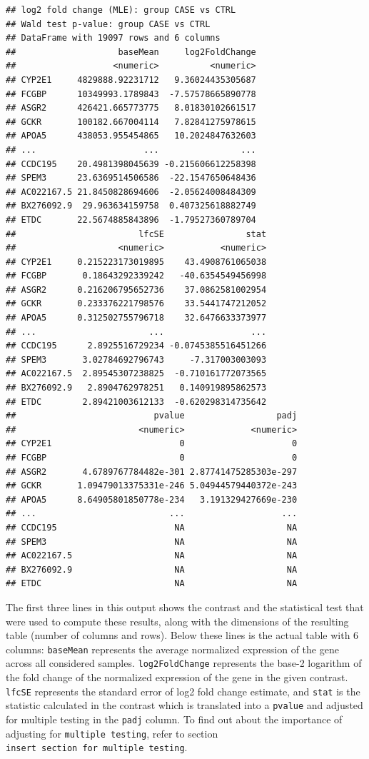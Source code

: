 \documentclass[12pt,]{krantz}
\begin{document}
\begin{verbatim}
## log2 fold change (MLE): group CASE vs CTRL 
## Wald test p-value: group CASE vs CTRL 
## DataFrame with 19097 rows and 6 columns
##                    baseMean     log2FoldChange
##                   <numeric>          <numeric>
## CYP2E1     4829888.92231712   9.36024435305687
## FCGBP      10349993.1789843  -7.57578665890778
## ASGR2      426421.665773775   8.01830102661517
## GCKR       100182.667004114   7.82841275978615
## APOA5      438053.955454865   10.2024847632603
## ...                     ...                ...
## CCDC195    20.4981398045639 -0.215606612258398
## SPEM3      23.6369514506586  -22.1547650648436
## AC022167.5 21.8450828694606  -2.05624008484309
## BX276092.9  29.963634159758  0.407325618882749
## ETDC       22.5674885843896  -1.79527360789704
##                        lfcSE                stat
##                    <numeric>           <numeric>
## CYP2E1     0.215223173019895    43.4908761065038
## FCGBP       0.18643292339242   -40.6354549456998
## ASGR2      0.216206795652736    37.0862581002954
## GCKR       0.233376221798576    33.5441747212052
## APOA5      0.312502755796718    32.6476633373977
## ...                      ...                 ...
## CCDC195      2.8925516729234 -0.0745385516451266
## SPEM3       3.02784692796743     -7.317003003093
## AC022167.5  2.89545307238825  -0.710161772073565
## BX276092.9   2.8904762978251   0.140919895862573
## ETDC        2.89421003612133  -0.620298314735642
##                           pvalue                  padj
##                        <numeric>             <numeric>
## CYP2E1                         0                     0
## FCGBP                          0                     0
## ASGR2       4.6789767784482e-301 2.87741475285303e-297
## GCKR       1.09479013375331e-246 5.04944579440372e-243
## APOA5      8.64905801850778e-234   3.191329427669e-230
## ...                          ...                   ...
## CCDC195                       NA                    NA
## SPEM3                         NA                    NA
## AC022167.5                    NA                    NA
## BX276092.9                    NA                    NA
## ETDC                          NA                    NA
\end{verbatim}

The first three lines in this output shows the contrast and the statistical test that were used to compute these results, along with the dimensions of the resulting table (number of columns and rows). Below these lines is the actual table with 6 columns: \texttt{baseMean} represents the average normalized expression of the gene across all considered samples. \texttt{log2FoldChange} represents the base-2 logarithm of the fold change of the normalized expression of the gene in the given contrast. \texttt{lfcSE} represents the standard error of log2 fold change estimate, and \texttt{stat} is the statistic calculated in the contrast which is translated into a \texttt{pvalue} and adjusted for multiple testing in the \texttt{padj} column. To find out about the importance of adjusting for \texttt{multiple\ testing}, refer to section \texttt{insert\ section\ for\ multiple\ testing}.
\end{document}
